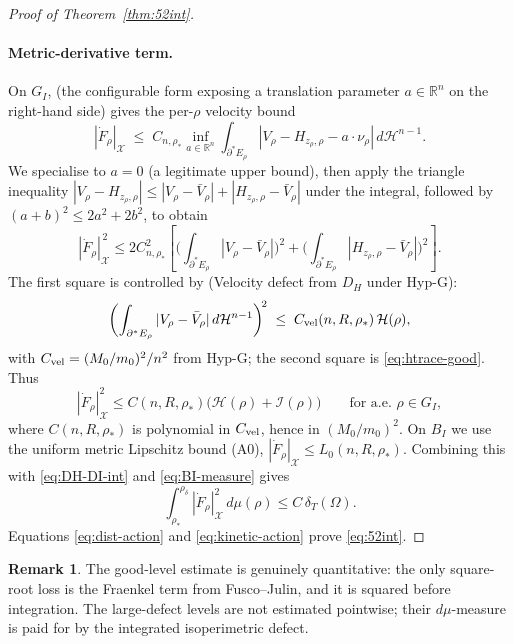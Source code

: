 \documentclass[11pt]{article}
\theoremstyle{definition}
\newtheorem{remark}[theorem]{Remark}
\newcommand{\R}{\mathbb{R}}
\newcommand{\Om}{\Omega}
\newcommand{\rstar}{\rho_{*}}
\newcommand{\X}{\mathcal X}
\begin{document}
\begin{proof}[Proof of Theorem~\ref{thm:52int}]
\paragraph{Metric-derivative term.}
On $G_I$, \cite[Thm.~T]{MetricFramework} (the configurable form
exposing a translation parameter $a\in\R^n$ on the right-hand side)
gives the per-$\rho$ velocity bound
\[
   |\dot F_\rho|_\X\;\le\;C_{n,\rstar}\inf_{a\in\R^n}\!
   \int_{\partial^*E_\rho}|V_\rho-H_{z_\rho,\rho}-a\cdot\nu_\rho|\,
     d\mathcal H^{n-1}.
\]
We specialise to $a=0$ (a legitimate upper bound), then apply the
triangle inequality
$|V_\rho-H_{z_\rho,\rho}|\le|V_\rho-\bar V_\rho|+|H_{z_\rho,\rho}-\bar V_\rho|$
under the integral, followed by $(a+b)^2\le 2a^2+2b^2$, to obtain
\begin{equation}\label{eq:Fdot-decomp}
   |\dot F_\rho|_\X^{\,2}\le 2C_{n,\rstar}^{2}
   \left[
      \biggl(\int_{\partial^*E_\rho}|V_\rho-\bar V_\rho|\biggr)^{\!2}
      +
      \biggl(\int_{\partial^*E_\rho}|H_{z_\rho,\rho}-\bar V_\rho|\biggr)^{\!2}
   \right].
\end{equation}
The first square is controlled by
\cite[Prop.~7.3]{LevelSetIdentity} (Velocity defect from $D_H$ under
Hyp-G):
\begin{equation}\label{eq:V-bar-V}
   \biggl(\int_{\partial^*E_\rho}|V_\rho-\bar V_\rho|\,
     d\mathcal H^{n-1}\biggr)^{\!2}
   \;\le\;C_{\rm vel}(n,R,\rstar)\,\mathcal H(\rho),
\end{equation}
with $C_{\rm vel}=(M_0/m_0)^2/n^2$ from Hyp-G; the second square is
\eqref{eq:htrace-good}.  Thus
\[
   |\dot F_\rho|_\X^2\le C(n,R,\rstar)\bigl(\mathcal H(\rho)+\mathcal I(\rho)\bigr)
   \qquad\text{for a.e. }\rho\in G_I,
\]
where $C(n,R,\rstar)$ is polynomial in $C_{\rm vel}$, hence in
$(M_0/m_0)^2$.
On $B_I$ we use the uniform metric Lipschitz bound (A0),
$|\dot F_\rho|_\X\le L_0(n,R,\rstar)$.  Combining this with
\eqref{eq:DH-DI-int} and \eqref{eq:BI-measure} gives
\begin{equation}\label{eq:kinetic-action}
   \int_{\rstar}^{\rho_\delta}|\dot F_\rho|_\X^2\,d\mu(\rho)
   \le C\,\delta_T(\Om).
\end{equation}
Equations \eqref{eq:dist-action} and \eqref{eq:kinetic-action} prove
\eqref{eq:52int}.
\end{proof}

\begin{remark}
The good-level estimate is genuinely quantitative: the only square-root
loss is the Fraenkel term from Fusco--Julin, and it is squared before
integration.  The large-defect levels are not estimated pointwise; their
$d\mu$-measure is paid for by the integrated isoperimetric defect.
\end{remark}
\end{document}
